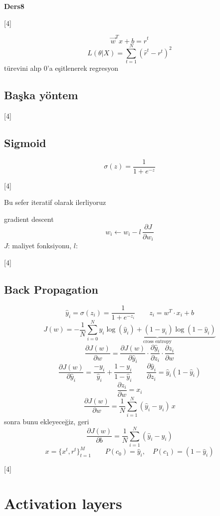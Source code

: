 \documentclass[11pt,a4paper]{article}
\begin{document}
\textbf{Ders8}

[4]

\[ \vec{w}^T x + b = \hat{r}^t \]
\[ L(\theta|X)=\sum_{t=1}^{N}(\hat{r}^t-r^t)^2 \]
türevini alıp 0'a eşitlenerek regresyon

\subsection{Başka yöntem}

[4]

\subsection{Sigmoid}
\[ \sigma(z)=\frac{1}{1+e^{-z}} \]

[4]

Bu sefer iteratif olarak ilerliyoruz

gradient descent
\[ w_i \leftarrow w_i - l\,\frac{\partial J}{\partial w_i} \]
$J$: maliyet fonksiyonu, $l$: 

[4]

\subsection{Back Propagation}
\[ \hat{y}_i=\sigma(z_i)=\frac{1}{1+e^{-z_i}} \qquad z_i=w^T\cdot x_i+b \]
\[ J(w)=-\frac{1}{N}\sum_{i=0}^{N}\underbrace{y_i\log(\hat{y}_i)+(1-y_i)\log(1-\hat{y}_i)}_{\text{cross entropy}} \]
\[ \frac{\partial J(w)}{\partial w}=\frac{\partial J(w)}{\partial \hat{y}_i}\cdot\frac{\partial \hat{y}_i}{\partial z_i}\cdot\frac{\partial z_i}{\partial w} \]
\okunamadi{}
\[ \frac{\partial J(w)}{\partial \hat{y}_i}=\frac{-y_i}{\hat{y}_i}+\frac{1-y_i}{1-\hat{y}_i} \qquad \frac{\partial \hat{y}_i}{\partial z_i}=\hat{y}_i(1-\hat{y}_i) \]
\[ \frac{\partial z_i}{\partial w}=x_i \]
\[ \frac{\partial J(w)}{\partial w}=\frac{1}{N}\sum_{i=1}^{N}(\hat{y}_i-y_i)\,x \]
sonra bunu ekleyeceğiz, geri 
\[ \frac{\partial J(w)}{\partial b}=\frac{1}{N}\sum_{i=1}^{N}(\hat{y}_i-y_i) \]
\[ x=\{x^t,r^t\}_{t=1}^{M} \qquad P(c_0)=\hat{y}_i,\quad P(c_1)=(1-\hat{y}_i) \]

[4]

\section{Activation layers}
\end{document}
